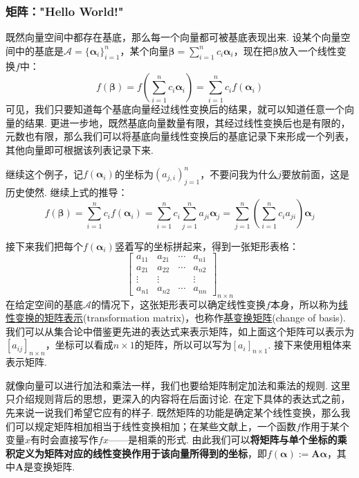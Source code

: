 \documentclass[main.tex]{subfiles}
\begin{document}
\subsubsection{矩阵："Hello World!"}

既然向量空间中都存在基底，那么每一个向量都可被基底表现出来. 设某个向量空间中的基底是\(\mathcal A = \{\bm\alpha_i\}_{i=1}^{n}\)，某个向量\(\displaystyle{\bm\beta = \sum_{i=1}^{n}c_i\bm\alpha_i}\)，现在把\(\bm\beta\)放入一个线性变换\(f\)中：
\[f(\bm\beta) = f\left(\sum_{i=1}^{n}c_i\bm\alpha_i\right) = \sum_{i=1}^{n}c_if(\bm\alpha_i)\]
可见，我们只要知道每个基底向量经过线性变换后的结果，就可以知道任意一个向量的结果. 更进一步地，既然基底向量数量有限，其经过线性变换后也是有限的，元数也有限，那么我们可以将基底向量线性变换后的基底记录下来形成一个列表，其他向量即可根据该列表记录下来.

继续这个例子，记\(f(\bm\alpha_i)\)的坐标为\((a_{j,i})_{j=1}^{n}\)，不要问我为什么\(j\)要放前面，这是历史使然. 继续上式的推导：
\begin{equation*}
    f(\bm\beta) = \sum_{i=1}^{n}c_if(\bm\alpha_i) = \sum_{i=1}^{n}c_i \sum_{j=1}^{n}a_{ji}\bm\alpha_j = \sum_{j=1}^{n} \left(\sum_{i=1}^{n}c_i a_{ji}\right)\bm\alpha_j \tag{*}
\end{equation*}

接下来我们把每个\(f(\bm\alpha_i)\)竖着写的坐标拼起来，得到一张矩形表格：
\[\left[\begin{array}{c|c|c|c}
    a_{11} & a_{21} & \cdots & a_{n1} \\
    a_{21} & a_{22} & \cdots & a_{n2} \\
    \vdots & \vdots & & \vdots \\
    a_{n1} & a_{n2} & \cdots & a_{nn}
\end{array}\right]_{n \times n}\]
在给定空间的基底\(\mathcal{A}\)的情况下，这张矩形表可以确定线性变换\(f\)本身，所以称为\uline{线性变换的矩阵表示}(transformation matrix)，也称作\uline{基变换矩阵}(change of basis). 我们可以从集合论中借鉴更先进的表达式来表示矩阵，如上面这个矩阵可以表示为\([a_{ij}]_{n \times n}\)，坐标可以看成\(n\times 1\)的矩阵，所以可以写为\([a_i]_{n \times 1}\). 接下来使用粗体来表示矩阵.

就像向量可以进行加法和乘法一样，我们也要给矩阵制定加法和乘法的规则. 这里只介绍规则背后的思想，更深入的内容将在后面讨论. 在定下具体的表达式之前，先来说一说我们希望它应有的样子. 既然矩阵的功能是确定某个线性变换，那么我们可以规定矩阵相加相当于线性变换相加；在某些文献上，一个函数\(f\)作用于某个变量\(x\)有时会直接写作\(fx\)——是相乘的形式. 由此我们可以\textbf{将矩阵与单个坐标的乘积定义为矩阵对应的线性变换作用于该向量所得到的坐标}，即\(f(\bm\alpha) := \bm A \bm\alpha\)，其中\(\bm A\)是变换矩阵.
\end{document}
